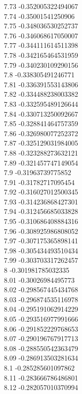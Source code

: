 {7.73	-0.352005322494067\\
7.74	-0.35001541250906\\
7.75	-0.348036530252737\\
7.76	-0.346068617050007\\
7.77	-0.344111614511398\\
7.78	-0.342165464531959\\
7.79	-0.340230109290156\\
7.8	-0.338305491246771\\
7.81	-0.336391553143806\\
7.82	-0.334488238003382\\
7.83	-0.332595489126644\\
7.84	-0.330713250092667\\
7.85	-0.328841464757359\\
7.86	-0.326980077252372\\
7.87	-0.325129031984005\\
7.88	-0.323288273632121\\
7.89	-0.321457747149054\\
7.9	-0.31963739775852\\
7.91	-0.31782717095454\\
7.92	-0.316027012500345\\
7.93	-0.314236868427301\\
7.94	-0.312456685033828\\
7.95	-0.310686408884316\\
7.96	-0.308925986808052\\
7.97	-0.307175365898141\\
7.98	-0.305434493510434\\
7.99	-0.303703317262457\\
8	-0.301981785032335\\
8.01	-0.30026984495773\\
8.02	-0.298567445434768\\
8.03	-0.296874535116978\\
8.04	-0.295191062914229\\
8.05	-0.293516977991666\\
8.06	-0.291852229768653\\
8.07	-0.290196767917713\\
8.08	-0.288550542363479\\
8.09	-0.286913503281634\\
8.1	-0.285285601097862\\
8.11	-0.283666786486801\\
8.12	-0.282057010370994\\
}
